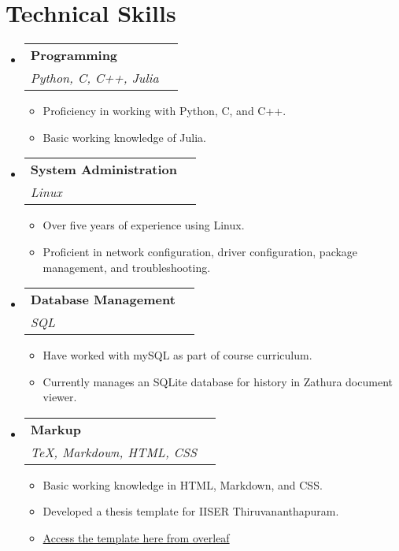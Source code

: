 \documentclass[letterpaper,11pt]{article}
\makeatletter
\newcommand{\resumeItem}[1]{
  \item\small{
    {#1 \vspace{-2pt}}
  }
}
\newcommand{\resumeSubheading}[4]{
  \vspace{-2pt}\item
    \begin{tabular*}{1.0\textwidth}[t]{l@{\extracolsep{\fill}}r}
      \textbf{#1} & \textbf{\small #2} \\
      \textit{\small#3} & \textit{\small #4} \\
    \end{tabular*}\vspace{-7pt}
}
\newcommand{\resumeSubHeadingListStart}{\begin{itemize}[leftmargin=0.0in, label={}]}
\newcommand{\resumeSubHeadingListEnd}{\end{itemize}}
\newcommand{\resumeItemListStart}{\begin{itemize}}
\newcommand{\resumeItemListEnd}{\end{itemize}\vspace{-4pt}}
\makeatother
\begin{document}
%
%
%
%
%

\section{Technical Skills}
    \resumeSubHeadingListStart

        \resumeSubheading{Programming}{}{Python, C, C++, Julia}{}
            \resumeItemListStart
                \resumeItem{Proficiency in working with Python, C, and C++.}
                \resumeItem{Basic working knowledge of Julia.}
            \resumeItemListEnd

        \resumeSubheading{System Administration}{}{Linux}{}
            \resumeItemListStart
              \resumeItem{Over five years of experience using Linux.}
              \resumeItem{Proficient in network configuration, driver configuration, package management, and troubleshooting.}
            \resumeItemListEnd

        \resumeSubheading{Database Management}{}{SQL}{}
            \resumeItemListStart
                \resumeItem{Have worked with mySQL as part of course curriculum.}
                \resumeItem{Currently manages an SQLite database for history in Zathura document viewer.}
            \resumeItemListEnd

        \resumeSubheading{Markup}{}{\TeX, Markdown, HTML, CSS}{}
            \resumeItemListStart
                \resumeItem{Basic working knowledge in HTML, Markdown, and CSS.}
                \resumeItem{Developed a thesis template for IISER Thiruvananthapuram.}
                \resumeItem{\href{https://tr.overleaf.com/latex/templates/official-iiser-thiruvananthapuram-thesis-template-clean-code/rfkxvprfvnwy}{Access the template here from overleaf}}
            \resumeItemListEnd
    \resumeSubHeadingListEnd
 \vspace{-16pt}
\end{document}
